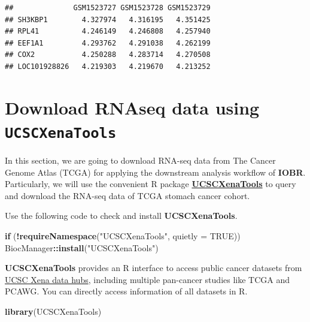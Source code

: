 \documentclass[
  12pt,
]{book}
\newenvironment{Shaded}{\begin{snugshade}}{\end{snugshade}}
\newcommand{\AttributeTok}[1]{\textcolor[rgb]{0.13,0.29,0.53}{#1}}
\newcommand{\ConstantTok}[1]{\textcolor[rgb]{0.56,0.35,0.01}{#1}}
\newcommand{\ControlFlowTok}[1]{\textcolor[rgb]{0.13,0.29,0.53}{\textbf{#1}}}
\newcommand{\FunctionTok}[1]{\textcolor[rgb]{0.13,0.29,0.53}{\textbf{#1}}}
\newcommand{\NormalTok}[1]{#1}
\newcommand{\SpecialCharTok}[1]{\textcolor[rgb]{0.81,0.36,0.00}{\textbf{#1}}}
\newcommand{\StringTok}[1]{\textcolor[rgb]{0.31,0.60,0.02}{#1}}
\begin{document}
\begin{verbatim}
##              GSM1523727 GSM1523728 GSM1523729
## SH3KBP1        4.327974   4.316195   4.351425
## RPL41          4.246149   4.246808   4.257940
## EEF1A1         4.293762   4.291038   4.262199
## COX2           4.250288   4.283714   4.270508
## LOC101928826   4.219303   4.219670   4.213252
\end{verbatim}

\hypertarget{download-rnaseq-data-using-ucscxenatools}{%
\section{\texorpdfstring{Download RNAseq data using \texttt{UCSCXenaTools}}{Download RNAseq data using UCSCXenaTools}}\label{download-rnaseq-data-using-ucscxenatools}}

In this section, we are going to download RNA-seq data from The Cancer Genome Atlas (TCGA) for applying the downstream analysis workflow of \textbf{IOBR}. Particularly, we will use the convenient R package \href{https://cran.r-project.org/web/packages/UCSCXenaTools/vignettes/USCSXenaTools.html}{\textbf{UCSCXenaTools}} to query and download the RNA-seq data of TCGA stomach cancer cohort.

Use the following code to check and install \textbf{UCSCXenaTools}.

\begin{Shaded}
\begin{Highlighting}[]
\ControlFlowTok{if}\NormalTok{ (}\SpecialCharTok{!}\FunctionTok{requireNamespace}\NormalTok{(}\StringTok{"UCSCXenaTools"}\NormalTok{, }\AttributeTok{quietly =} \ConstantTok{TRUE}\NormalTok{))  }
\NormalTok{  BiocManager}\SpecialCharTok{::}\FunctionTok{install}\NormalTok{(}\StringTok{"UCSCXenaTools"}\NormalTok{)}
\end{Highlighting}
\end{Shaded}

\textbf{UCSCXenaTools} provides an R interface to access public cancer datasets from \href{https://xenabrowser.net/datapages/}{UCSC Xena data hubs}, including multiple pan-cancer studies like TCGA and PCAWG. You can directly access information of all datasets in R.

\begin{Shaded}
\begin{Highlighting}[]
\FunctionTok{library}\NormalTok{(UCSCXenaTools)}
\end{Highlighting}
\end{Shaded}
\end{document}
